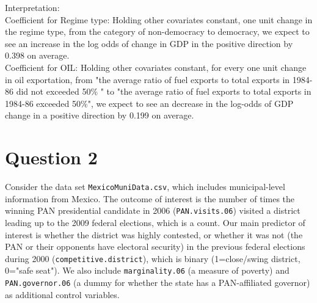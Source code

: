 \documentclass[12pt,letterpaper]{article}
\begin{document}
\begin{enumerate}
Interpretation:\\
Coefficient for Regime type: Holding other covariates constant, one unit change in the regime type, from the category of non-democracy to democracy, we expect to see an increase in the log odds of change in GDP in the positive direction by 0.398 on average.\\ 

Coefficient for OIL: Holding other covariates constant, for every one unit change in oil exportation, from "the average ratio of fuel exports to total exports in 1984-86 did not exceeded 50\% " to "the average ratio of fuel exports to total exports in 1984-86 exceeded 50\%", we expect to see an decrease in the log-odds of GDP change in a positive direction by 0.199 on average. \\
\end{enumerate}

\section*{Question 2} 
\vspace{.25cm}

\noindent Consider the data set \texttt{MexicoMuniData.csv}, which includes municipal-level information from Mexico. The outcome of interest is the number of times the winning PAN presidential candidate in 2006 (\texttt{PAN.visits.06}) visited a district leading up to the 2009 federal elections, which is a count. Our main predictor of interest is whether the district was highly contested, or whether it was not (the PAN or their opponents have electoral security) in the previous federal elections during 2000 (\texttt{competitive.district}), which is binary (1=close/swing district, 0="safe seat"). We also include \texttt{marginality.06} (a measure of poverty) and \texttt{PAN.governor.06} (a dummy for whether the state has a PAN-affiliated governor) as additional control variables. 
\end{document}
